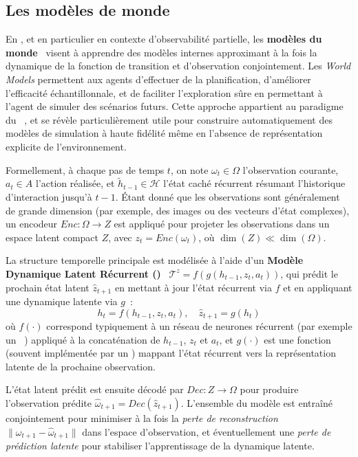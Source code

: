 \subsection{Les modèles de monde}

En , et en particulier en contexte d'observabilité partielle, les \textbf{modèles du monde}~\cite{ha2018recurrent, hafner2020dream} visent à apprendre des modèles internes approximant à la fois la dynamique de la fonction de transition et d'observation conjointement. Les \textit{World Models} permettent aux agents d'effectuer de la planification, d'améliorer l'efficacité échantillonnale, et de faciliter l'exploration sûre en permettant à l'agent de simuler des scénarios futurs. Cette approche appartient au paradigme du ~\cite{moerland2020model}, et se révèle particulièrement utile pour construire automatiquement des modèles de simulation à haute fidélité même en l'absence de représentation explicite de l'environnement.

Formellement, à chaque pas de temps $t$, on note $\omega_t \in \Omega$ l'observation courante, $a_t \in A$ l'action réalisée, et $\tilde{h}_{t-1} \in \mathcal{H}$ l'état caché récurrent résumant l'historique d'interaction jusqu'à $t-1$. Étant donné que les observations sont généralement de grande dimension (par exemple, des images ou des vecteurs d'état complexes), un encodeur $Enc: \Omega \rightarrow Z$ est appliqué pour projeter les observations dans un espace latent compact $Z$, avec $z_t = Enc(\omega_t)$, où $\dim(Z) \ll \dim(\Omega)$.

La structure temporelle principale est modélisée à l'aide d'un \textbf{Modèle Dynamique Latent Récurrent ()}~\cite{hafner2020dream} $\mathcal{T}^{z} = f(g(h_{t-1}, z_t, a_t))$, qui prédit le prochain état latent $\hat{z}_{t+1}$ en mettant à jour l'état récurrent via $f$ et en appliquant une dynamique latente via $g$~:
\[
  h_t = f(h_{t-1}, z_t, a_t), \quad \hat{z}_{t+1} = g(h_t)
\]
où $f(\cdot)$ correspond typiquement à un réseau de neurones récurrent (par exemple un ~\cite{hochreiter1997long}) appliqué à la concaténation de $h_{t-1}$, $z_t$ et $a_t$, et $g(\cdot)$ est une fonction (souvent implémentée par un ) mappant l'état récurrent vers la représentation latente de la prochaine observation.

L'état latent prédit est ensuite décodé par $Dec: Z \rightarrow \Omega$ pour produire l'observation prédite $\hat{\omega}_{t+1} = Dec(\hat{z}_{t+1})$. L'ensemble du modèle est entraîné conjointement pour minimiser à la fois la \emph{perte de reconstruction} $\|\omega_{t+1} - \hat{\omega}_{t+1}\|$ dans l'espace d'observation, et éventuellement une \emph{perte de prédiction latente} pour stabiliser l'apprentissage de la dynamique latente.


